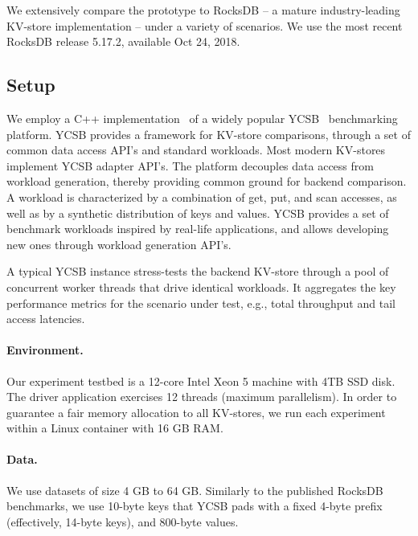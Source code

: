 We extensively compare the \sys\/ prototype to RocksDB -- a mature industry-leading KV-store implementation  -- under a variety of scenarios.  We use the most recent RocksDB release 5.17.2, available Oct 24, 2018.  

\subsection{Setup}
We employ a C++ implementation~\cite{Cpp-YCSB} of a widely popular YCSB~\cite{YCSB} benchmarking platform. 
YCSB provides a framework for KV-store comparisons, through a set of common data access API's and standard workloads. 
Most modern KV-stores implement  YCSB adapter API's. The platform decouples data access from workload generation, 
thereby providing common ground for backend comparison. A workload is characterized by a combination of get, put, 
and scan accesses, as well as by a synthetic distribution of keys and values. YCSB provides a set of benchmark workloads
inspired by real-life applications, and allows developing new ones through workload generation API's. 

A typical YCSB instance stress-tests the backend KV-store through a pool of concurrent worker threads that drive identical
workloads. It aggregates the key performance metrics for the scenario under test, e.g., total throughput and tail access latencies. 

\paragraph{Environment.}
Our experiment testbed is a 12-core Intel Xeon 5 machine with 4TB SSD disk. The driver application exercises 12 threads (maximum parallelism). In order to guarantee a fair memory allocation to all KV-stores, we run each experiment 
within a Linux container with 16 GB RAM. 

\paragraph{Data.} We use datasets of size 4 GB to 64 GB. Similarly to the published RocksDB benchmarks, we use 
10-byte keys that YCSB pads with a fixed 4-byte prefix (effectively, 14-byte keys), and 800-byte values. 

